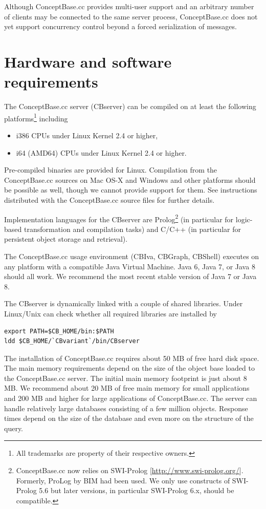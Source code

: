 Although ConceptBase.cc provides multi-user support and
an arbitrary number of clients may be connected to the same server process,
ConceptBase.cc does not yet support concurrency control beyond a forced
serialization of messages.




\section{Hardware and software requirements}
\label{sec:requirements}

The ConceptBase.cc server (CBserver) can be compiled on at
least the following platforms\footnote{All trademarks are property of their respective
owners.} including
\begin{itemize}
\item i386 CPUs under Linux Kernel 2.4 or higher,
\item i64 (AMD64) CPUs under Linux Kernel 2.4 or higher.
\end{itemize}
Pre-compiled binaries are provided for Linux.
Compilation from the ConceptBase.cc sources on Mac OS-X and Windows and other platforms should
be possible as well, though we cannot provide support for them.
See instructions distributed with the ConceptBase.cc source files for further details.

Implementation languages for the CBserver are Prolog\footnote{ConceptBase.cc now
relies on SWI-Prolog [\url{http://www.swi-prolog.org/}]. Formerly,
ProLog by BIM had been used. We only use constructs of SWI-Prolog 5.6 but
later versions, in particular SWI-Prolog 6.x, should be compatible.}
(in particular for logic-based transformation and compilation
tasks) and C/C++ (in particular for persistent object
storage and retrieval).

The ConceptBase.cc usage environment (CBIva, CBGraph, CBShell) executes on any platform with
a compatible Java Virtual Machine. Java 6, Java 7, or Java 8
should all work. We recommend the most recent stable version of Java 7 or
Java 8.

The CBserver is dynamically linked with a couple of shared
libraries. Under Linux/Unix can check whether all required libraries
are installed by
  
\begin{verbatim}
export PATH=$CB_HOME/bin:$PATH
ldd $CB_HOME/`CBvariant`/bin/CBserver
\end{verbatim}



The installation of ConceptBase.cc requires about 50 MB of free hard disk space. The
main memory requirements depend on the size of the object base
loaded to the ConceptBase.cc server. The initial main memory footprint is just
about 8 MB. We recommend about 20 MB of free main memory for
small applications and 200 MB and higher for large applications
of ConceptBase.cc. The server can handle relatively large databases
consisting of a few million objects.  Response times depend on
the size of the database and even more on the structure of the query.

